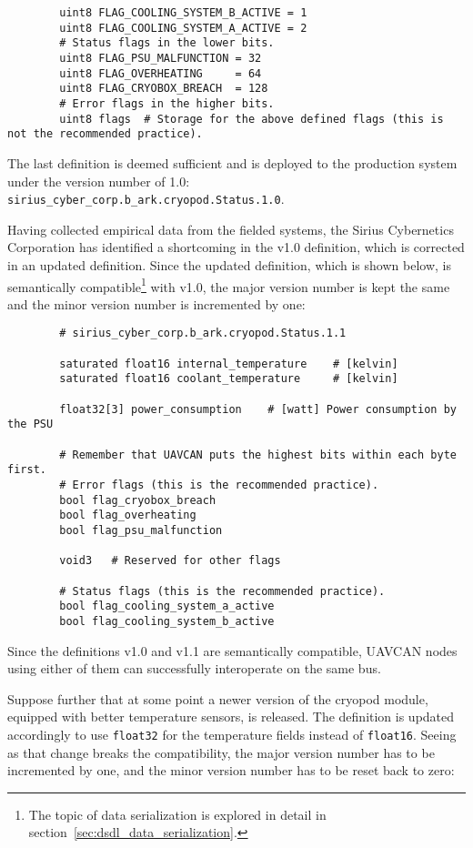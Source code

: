 \begin{remark}[breakable]
\begin{verbatim}
        uint8 FLAG_COOLING_SYSTEM_B_ACTIVE = 1
        uint8 FLAG_COOLING_SYSTEM_A_ACTIVE = 2
        # Status flags in the lower bits.
        uint8 FLAG_PSU_MALFUNCTION = 32
        uint8 FLAG_OVERHEATING     = 64
        uint8 FLAG_CRYOBOX_BREACH  = 128
        # Error flags in the higher bits.
        uint8 flags  # Storage for the above defined flags (this is not the recommended practice).
    \end{verbatim}

    The last definition is deemed sufficient and is deployed to the production system
    under the version number of 1.0: \verb|sirius_cyber_corp.b_ark.cryopod.Status.1.0|.

    Having collected empirical data from the fielded systems, the Sirius Cybernetics Corporation has
    identified a shortcoming in the v1.0 definition, which is corrected in an updated definition.
    Since the updated definition, which is shown below, is semantically compatible\footnote{%
        The topic of data serialization is explored in detail in section~\ref{sec:dsdl_data_serialization}.
    } with v1.0, the major version number is kept the same and the minor version number is incremented by one:

    \begin{verbatim}
        # sirius_cyber_corp.b_ark.cryopod.Status.1.1

        saturated float16 internal_temperature    # [kelvin]
        saturated float16 coolant_temperature     # [kelvin]

        float32[3] power_consumption    # [watt] Power consumption by the PSU

        # Remember that UAVCAN puts the highest bits within each byte first.
        # Error flags (this is the recommended practice).
        bool flag_cryobox_breach
        bool flag_overheating
        bool flag_psu_malfunction
        
        void3   # Reserved for other flags
        
        # Status flags (this is the recommended practice).
        bool flag_cooling_system_a_active
        bool flag_cooling_system_b_active
    \end{verbatim}

    Since the definitions v1.0 and v1.1 are semantically compatible,
    UAVCAN nodes using either of them can successfully interoperate on the same bus.

    Suppose further that at some point a newer version of the cryopod module,
    equipped with better temperature sensors, is released.
    The definition is updated accordingly to use \verb|float32| for the temperature fields instead of \verb|float16|.
    Seeing as that change breaks the compatibility, the major version number has to be incremented by one,
    and the minor version number has to be reset back to zero:


\end{remark}
